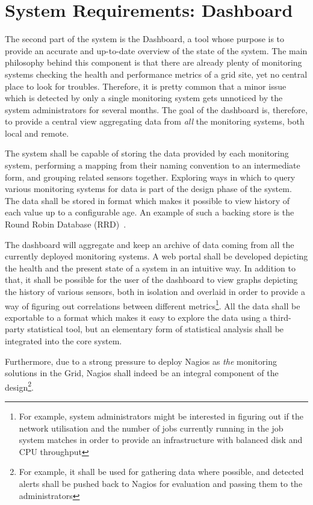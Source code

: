 \documentclass[12pt]{article}
\begin{document}
\section{System Requirements: Dashboard}

The second part of the system is the Dashboard, a tool whose purpose is to provide an accurate and up-to-date overview of the
state of the system.  The main philosophy behind this component is that there are already plenty of monitoring systems checking
the health and performance metrics of a grid site, yet no central place to look for troubles.  Therefore, it is pretty common that
a minor issue which is detected by only a single monitoring system gets unnoticed by the system administrators for several months.
The goal of the dashboard is, therefore, to provide a central view aggregating data from {\em all} the monitoring systems, both
local and remote.

The system shall be capable of storing the data provided by each monitoring system, performing a mapping from their naming
convention to an intermediate form, and grouping related sensors together.  Exploring ways in which to query various monitoring
systems for data is part of the design phase of the system.  The data shall be stored in format which makes it possible to view
history of each value up to a configurable age.  An example of such a backing store is the Round Robin Database (RRD)~\cite{rrd}.

The dashboard will aggregate and keep an archive of data coming from all the currently deployed monitoring systems.  A web portal
shall be developed depicting the health and the present state of a system in an intuitive way.  In addition to that, it shall be
possible for the user of the dashboard to view graphs depicting the history of various sensors, both in isolation and overlaid in
order to provide a way of figuring out correlations between different metrics\footnote{For example, system administrators might be
interested in figuring out if the network utilisation and the number of jobs currently running in the job system matches in order
to provide an infrastructure with balanced disk and CPU throughput}.  All the data shall be exportable to a format which makes it
easy to explore the data using a third-party statistical tool, but an elementary form of statistical analysis shall be integrated
into the core system.

Furthermore, due to a strong pressure to deploy Nagios as {\em the} monitoring solutions in the Grid, Nagios shall indeed be an
integral component of the design\footnote{For example, it shall be used for gathering data where possible, and detected alerts
shall be pushed back to Nagios for evaluation and passing them to the administrators}.
\end{document}
